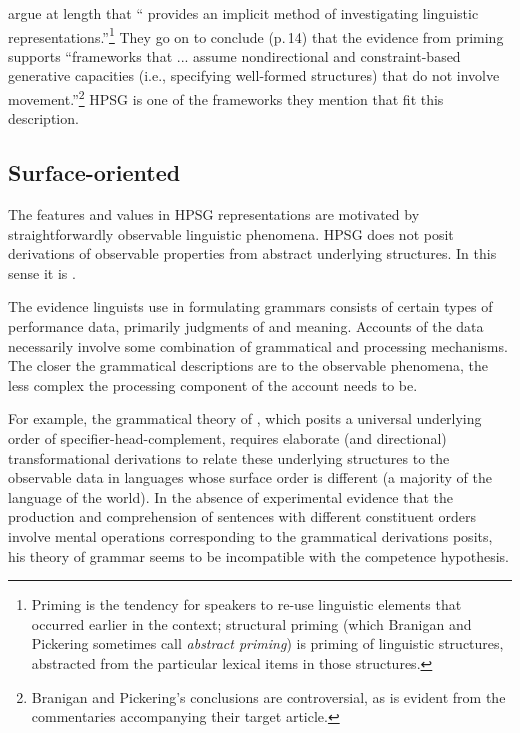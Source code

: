 \documentclass[a4paper]{article}
\begin{document}
\citet{BraniganPickering2017} argue at length that `` provides an implicit method of investigating linguistic representations.''\footnote{Priming is the tendency for speakers to re-use linguistic elements that occurred earlier in the context; structural priming (which Branigan and Pickering sometimes call \emph{abstract priming}) is priming of linguistic structures, abstracted from the particular lexical items in those structures.}  They go on to conclude (p.\,14) that the evidence from priming supports ``frameworks that ... assume nondirectional and constraint-based generative capacities (i.e., specifying well-formed structures) that do not involve movement.''\footnote{Branigan and Pickering's conclusions are controversial, as is evident from the commentaries accompanying their target article.}  HPSG is one of the frameworks they mention that fit this description.   

\subsection{Surface-oriented}

The features and values in HPSG representations are motivated by straightforwardly observable linguistic phenomena. HPSG does not posit derivations of observable properties from abstract
underlying structures.  In this sense it is .

The evidence linguists use in formulating grammars consists of certain types of performance data, primarily judgments of  and meaning.  Accounts of the data necessarily involve some
combination of grammatical and processing mechanisms.  The closer the grammatical descriptions are to the observable phenomena, the less complex the processing component of the account needs to be.

For example, the grammatical theory of \citet{Kayne94a-u}, which posits a universal underlying order of specifier-head-complement, requires elaborate (and directional) transformational derivations to
relate these underlying structures to the observable data in languages whose surface order is different (a majority of the language of the world).  In the absence of experimental evidence that
the production and comprehension of sentences with different constituent orders involve mental operations corresponding to the grammatical derivations \citeauthor{Kayne94a-u} posits, his theory of grammar seems to be incompatible with the competence hypothesis.
\end{document}
